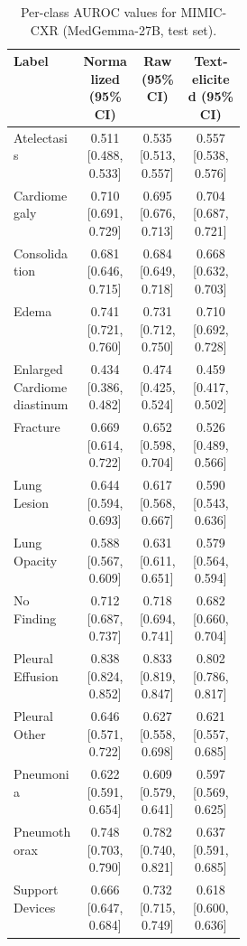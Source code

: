 \begin{table}[htbp]
\centering
\footnotesize
\setlength{\tabcolsep}{4pt}
\caption{Per-class AUROC values for MIMIC-CXR (MedGemma-27B, test set).}\label{tab:auroc_MIMIC}
\begin{tabular}{p{0.3\linewidth}ccc}
\toprule
Label & Normalized (95\% CI) & Raw (95\% CI) & Text-elicited (95\% CI) \\
\midrule
Atelectasis & 0.511 [0.488, 0.533] & 0.535 [0.513, 0.557] & 0.557 [0.538, 0.576] \\
Cardiomegaly & 0.710 [0.691, 0.729] & 0.695 [0.676, 0.713] & 0.704 [0.687, 0.721] \\
Consolidation & 0.681 [0.646, 0.715] & 0.684 [0.649, 0.718] & 0.668 [0.632, 0.703] \\
Edema & 0.741 [0.721, 0.760] & 0.731 [0.712, 0.750] & 0.710 [0.692, 0.728] \\
Enlarged Cardiomediastinum & 0.434 [0.386, 0.482] & 0.474 [0.425, 0.524] & 0.459 [0.417, 0.502] \\
Fracture & 0.669 [0.614, 0.722] & 0.652 [0.598, 0.704] & 0.526 [0.489, 0.566] \\
Lung Lesion & 0.644 [0.594, 0.693] & 0.617 [0.568, 0.667] & 0.590 [0.543, 0.636] \\
Lung Opacity & 0.588 [0.567, 0.609] & 0.631 [0.611, 0.651] & 0.579 [0.564, 0.594] \\
No Finding & 0.712 [0.687, 0.737] & 0.718 [0.694, 0.741] & 0.682 [0.660, 0.704] \\
Pleural Effusion & 0.838 [0.824, 0.852] & 0.833 [0.819, 0.847] & 0.802 [0.786, 0.817] \\
Pleural Other & 0.646 [0.571, 0.722] & 0.627 [0.558, 0.698] & 0.621 [0.557, 0.685] \\
Pneumonia & 0.622 [0.591, 0.654] & 0.609 [0.579, 0.641] & 0.597 [0.569, 0.625] \\
Pneumothorax & 0.748 [0.703, 0.790] & 0.782 [0.740, 0.821] & 0.637 [0.591, 0.685] \\
Support Devices & 0.666 [0.647, 0.684] & 0.732 [0.715, 0.749] & 0.618 [0.600, 0.636] \\
\bottomrule
\end{tabular}
\end{table}

